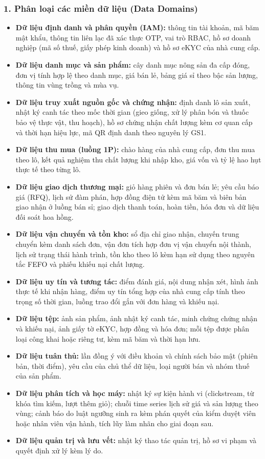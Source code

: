 \subsubsection*{1. Phân loại các miền dữ liệu (Data Domains)}
\begin{itemize}
    \item \textbf{Dữ liệu định danh và phân quyền (IAM):} thông tin tài khoản, mã băm mật khẩu, thông tin liên lạc đã xác thực OTP, vai trò RBAC, hồ sơ doanh nghiệp (mã số thuế, giấy phép kinh doanh) và hồ sơ eKYC của nhà cung cấp.
    \item \textbf{Dữ liệu danh mục và sản phẩm:} cây danh mục nông sản đa cấp đóng, đơn vị tính hợp lệ theo danh mục, giá bán lẻ, bảng giá sỉ theo bậc sản lượng, thông tin vùng trồng và mùa vụ.
    \item \textbf{Dữ liệu truy xuất nguồn gốc và chứng nhận:} định danh lô sản xuất, nhật ký canh tác theo mốc thời gian (gieo giống, xử lý phân bón và thuốc bảo vệ thực vật, thu hoạch), hồ sơ chứng nhận chất lượng kèm cơ quan cấp và thời hạn hiệu lực, mã QR định danh theo nguyên lý GS1.
    \item \textbf{Dữ liệu thu mua (luồng 1P):} chào hàng của nhà cung cấp, đơn thu mua theo lô, kết quả nghiệm thu chất lượng khi nhập kho, giá vốn và tỷ lệ hao hụt thực tế theo từng lô.
    \item \textbf{Dữ liệu giao dịch thương mại:} giỏ hàng phiên và đơn bán lẻ; yêu cầu báo giá (RFQ), lịch sử đàm phán, hợp đồng điện tử kèm mã băm và biên bản giao nhận ở luồng bán sỉ; giao dịch thanh toán, hoàn tiền, hóa đơn và dữ liệu đối soát hoa hồng.
    \item \textbf{Dữ liệu vận chuyển và tồn kho:} sổ địa chỉ giao nhận, chuyến trung chuyển kèm danh sách đơn, vận đơn tích hợp đơn vị vận chuyển nội thành, lịch sử trạng thái hành trình, tồn kho theo lô kèm hạn sử dụng theo nguyên tắc FEFO và phiếu khiếu nại chất lượng.
    \item \textbf{Dữ liệu uy tín và tương tác:} điểm đánh giá, nội dung nhận xét, hình ảnh thực tế khi nhận hàng, điểm uy tín tổng hợp của nhà cung cấp tính theo trọng số thời gian, luồng trao đổi gắn với đơn hàng và khiếu nại.
    \item \textbf{Dữ liệu tệp:} ảnh sản phẩm, ảnh nhật ký canh tác, minh chứng chứng nhận và khiếu nại, ảnh giấy tờ eKYC, hợp đồng và hóa đơn; mỗi tệp được phân loại công khai hoặc riêng tư, kèm mã băm và thời hạn lưu.
    \item \textbf{Dữ liệu tuân thủ:} lần đồng ý với điều khoản và chính sách bảo mật (phiên bản, thời điểm), yêu cầu của chủ thể dữ liệu, loại người bán và nhóm thuế của sản phẩm.
    \item \textbf{Dữ liệu phân tích và học máy:} nhật ký sự kiện hành vi (clickstream, từ khóa tìm kiếm, lượt thêm giỏ); chuỗi time series lịch sử giá và sản lượng theo vùng; cảnh báo do luật ngưỡng sinh ra kèm phán quyết của kiểm duyệt viên hoặc nhân viên vận hành, tích lũy làm nhãn cho giai đoạn sau.
    \item \textbf{Dữ liệu quản trị và lưu vết:} nhật ký thao tác quản trị, hồ sơ vi phạm và quyết định xử lý kèm lý do.
\end{itemize}

